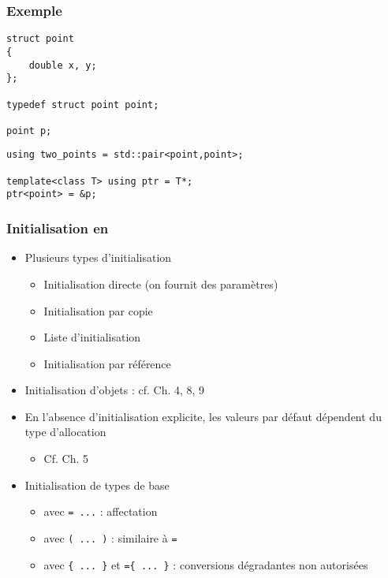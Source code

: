 \begin{frame}[containsverbatim]
\frametitle{Exemple}
\begin{lstlisting}
struct point 
{
	double x, y;
};

typedef struct point point;

point p;
\end{lstlisting}
\begin{lstlisting}
using two_points = std::pair<point,point>;

template<class T> using ptr = T*;
ptr<point> = &p;
\end{lstlisting}
\end{frame}

\begin{frame}
\frametitle{Initialisation en \cpp}
\begin{itemize}[<+->]
\item Plusieurs types d'initialisation
	\begin{itemize}
	\item Initialisation directe (on fournit des paramètres)
	\item Initialisation par copie
	\item Liste d'initialisation
	\item Initialisation par référence
	\end{itemize}
\item Initialisation d'objets : cf. Ch. 4, 8, 9
\item En l'absence d'initialisation explicite, les valeurs par défaut dépendent du type d'allocation
	\begin{itemize}
	\item Cf. Ch. 5
	\end{itemize}
\item Initialisation de types de base
	\begin{itemize}
	\item avec \texttt{= ...} : affectation
	\item avec \texttt{( ... )} : similaire à \texttt{=}
	\item avec \texttt{\{ ... \}} et \texttt{=\{ ... \}} : conversions dégradantes non autorisées
	\end{itemize}
\end{itemize}
\end{frame}

